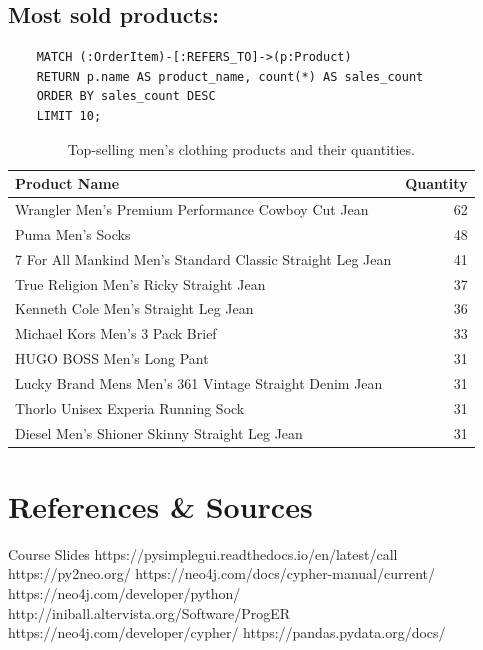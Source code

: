 \documentclass[a4paper,12pt]{article}
\begin{document}
  \subsection{Most sold products:}
  \begin{verbatim}  
    MATCH (:OrderItem)-[:REFERS_TO]->(p:Product)
    RETURN p.name AS product_name, count(*) AS sales_count
    ORDER BY sales_count DESC
    LIMIT 10;
  \end{verbatim}
  \begin{table}[h!]
    \centering
    \begin{tabular}{p{8cm}r} %
    \toprule
    \textbf{Product Name} & \textbf{Quantity} \\ 
    \midrule
    Wrangler Men's Premium Performance Cowboy Cut Jean & 62 \\
    Puma Men's Socks & 48 \\
    7 For All Mankind Men's Standard Classic Straight Leg Jean & 41 \\
    True Religion Men's Ricky Straight Jean & 37 \\
    Kenneth Cole Men's Straight Leg Jean & 36 \\
    Michael Kors Men's 3 Pack Brief & 33 \\
    HUGO BOSS Men's Long Pant & 31 \\
    Lucky Brand Mens Men's 361 Vintage Straight Denim Jean & 31 \\
    Thorlo Unisex Experia Running Sock & 31 \\
    Diesel Men's Shioner Skinny Straight Leg Jean & 31 \\
    \bottomrule
    \end{tabular}
    \caption{Top-selling men's clothing products and their quantities.}
    \label{tab:top_selling_products}
    \end{table}






\newpage
\section{References \& Sources}
  \begin{thebibliography}{9}
    \bibitem{} Course Slides
    \bibitem{} https://pysimplegui.readthedocs.io/en/latest/call%
    \bibitem{} https://py2neo.org/
    \bibitem{} https://neo4j.com/docs/cypher-manual/current/
    \bibitem{} https://neo4j.com/developer/python/
    \bibitem{} http://iniball.altervista.org/Software/ProgER
    \bibitem{} https://neo4j.com/developer/cypher/
    \bibitem{} https://pandas.pydata.org/docs/
  \end{thebibliography}
\end{document}
